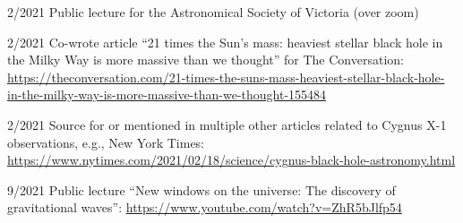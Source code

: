 \documentclass[margin,line]{res}
\begin{document}
\begin{resume}
2/2021 	Public lecture for the Astronomical Society of Victoria (over zoom)

2/2021 	Co-wrote article ``21 times the Sun's mass: heaviest stellar black hole in the Milky Way is more massive than we thought'' for The Conversation: \url{https://theconversation.com/21-times-the-suns-mass-heaviest-stellar-black-hole-in-the-milky-way-is-more-massive-than-we-thought-155484}

2/2021	Source for or mentioned in multiple other articles related to Cygnus X-1 observations, e.g., New York Times: \url{https://www.nytimes.com/2021/02/18/science/cygnus-black-hole-astronomy.html}
	  
9/2021	Public lecture ``New windows on the universe: The discovery of gravitational waves'': \url{https://www.youtube.com/watch?v=ZhR5bJlfp54}
	  
\end{resume}
\end{document}
